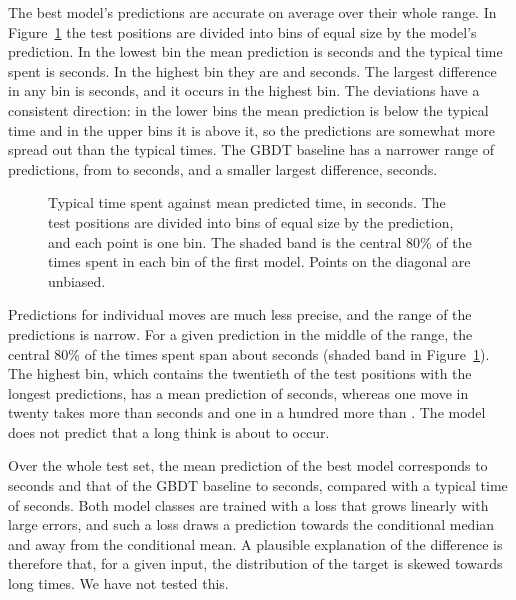\documentclass[11pt]{article}
\begin{document}
The best model's predictions are accurate on average over their whole range.
In Figure~\ref{fig:reliability} the test positions are divided into
 bins of equal size by the model's prediction. In
the lowest bin the mean prediction is 
seconds and the typical time spent is 
seconds. In the highest bin they are  and
 seconds. The largest difference in any
bin is  seconds, and it occurs in the highest
bin. The deviations have a consistent direction: in the lower bins the mean
prediction is below the typical time and in the upper bins it is above it, so
the predictions are somewhat more spread out than the typical times. The GBDT
baseline has a narrower
range of predictions, from  to
 seconds, and a smaller largest
difference,  seconds.

\begin{figure}[htbp]\centering
{}
\caption{Typical time spent against mean predicted time, in seconds. The test
positions are divided into bins of equal size by the prediction, and each
point is one bin. The shaded band is the central 80\% of the times spent in
each bin of the first model. Points on the diagonal are unbiased.}
\label{fig:reliability}
\end{figure}

Predictions for individual moves are much less precise, and the range of the
predictions is narrow. For a given prediction in the middle of the range, the
central 80\% of the times spent span about 
seconds (shaded band in Figure~\ref{fig:reliability}). The highest bin, which
contains the twentieth of the test positions with the longest predictions,
has a mean prediction of  seconds, whereas
one move in twenty takes more than  seconds and one in
a hundred more than . The model does not predict that a
long think is about to occur.

Over the whole test set, the mean prediction of the best model corresponds to
 seconds and that of the
GBDT baseline to  seconds, compared with a typical
time of  seconds. Both model classes are trained with a
loss that grows linearly with large errors, and such a loss draws a
prediction towards the conditional median and away from the conditional mean.
A plausible explanation of the difference is therefore that, for a given
input, the distribution of the target is skewed towards long times. We have
not tested this.
\end{document}
